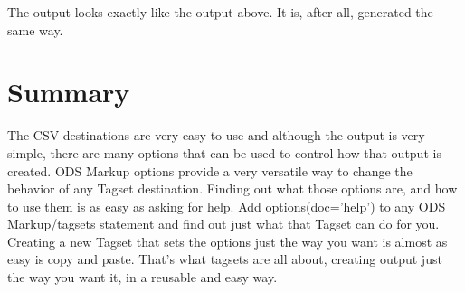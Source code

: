 The output looks exactly like the output above.  It is, after all, generated the same way.

\section{Summary}
The CSV destinations are very easy to use and although the output is very simple, there are
many options that can be used to control how that output is created.  ODS Markup options 
provide a very versatile way to change the behavior of any Tagset destination.  Finding out
what those options are, and how to use them is as easy as asking for help.  Add options(doc='help')
to any ODS Markup/tagsets statement and find out just what that Tagset can do for you.
Creating a new Tagset that sets the options just the way you want is almost as easy is copy
and paste.    
That's what tagsets are all about, creating output just the way you want it,
in a reusable and easy way.






